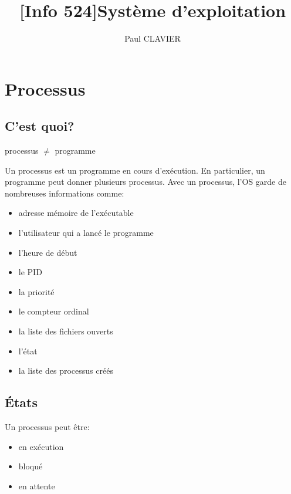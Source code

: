 \documentclass[10pt,a4paper]{article}
\author{Paul CLAVIER}
\title{[Info 524]Système d'exploitation}
\begin{document}
\maketitle
\newpage
\tableofcontents
\newpage
\section{Processus}
	\subsection{C'est quoi?}
		\begin{center}
			processus $\neq$ programme
		\end{center}
		Un processus est un programme en cours d’exécution. En particulier, un programme peut donner plusieurs processus. Avec un processus, l'OS garde de nombreuses informations comme:
		\begin{itemize}
			\item adresse mémoire de l’exécutable
			\item l'utilisateur qui a lancé le programme
			\item l'heure de début
			\item le PID
			\item la priorité
			\item le compteur ordinal
			\item la liste des fichiers ouverts
			\item l'état
			\item la liste des processus créés			
		\end{itemize}
	\subsection{États}
		Un processus peut être:
		\begin{itemize}
			\item en exécution
			\item bloqué
			\item en attente
		\end{itemize}
\end{document}
